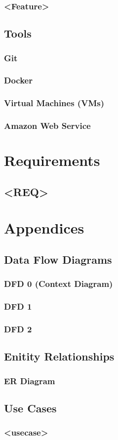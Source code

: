 \documentclass{article}
\begin{document}
        \subsubsection{<Feature>}
    \subsection{Tools}
        \subsubsection{Git}
        \subsubsection{Docker}
        \subsubsection{Virtual Machines (VMs)}
        \subsubsection{Amazon Web Service}
\section{Requirements}
    \subsection{<REQ>}
\section{Appendices}
    \subsection{Data Flow Diagrams}
        \subsubsection{DFD 0 (Context Diagram)}
        \subsubsection{DFD 1}
        \subsubsection{DFD 2}
    \subsection{Enitity Relationships}
        \subsubsection{ER Diagram}
    \subsection{Use Cases}
        \subsubsection{<usecase>}
\end{document}
